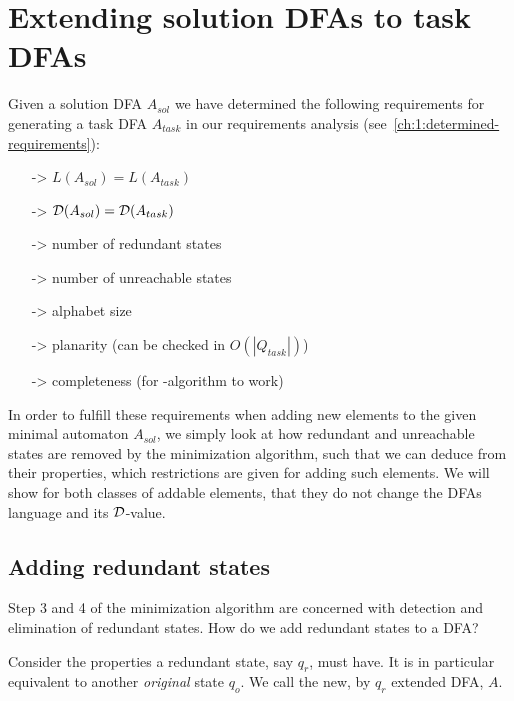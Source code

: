 
\chapter{Extending solution DFAs to task DFAs} \label{ch:3}

Given a solution DFA $A_{sol}$ we have determined the following requirements for generating a task DFA $A_{task}$ in our requirements analysis (see~\ref{ch:1:determined-requirements}):
\begin{itemize}
	\item[->] $L(A_{sol}) = L(A_{task})$
	\item[->] $\mathcal{D}(A_{sol}) = \mathcal{D}(A_{task})$
	\item[->] number of redundant states
	\item[->] number of unreachable states
	\item[->] alphabet size
	\item[->] planarity (can be checked in $O(|Q_{task}|)$)
	\item[->] completeness (for \CompDist-algorithm to work)
\end{itemize}
In order to fulfill these requirements when adding new elements to the given minimal automaton $A_{sol}$, we simply look at how redundant and unreachable states are removed by the minimization algorithm, such that we can deduce from their properties, which restrictions are given for adding such elements. We will show for both classes of addable elements, that they do not change the DFAs language and its $\mathcal{D}$-value.


\section{Adding redundant states}

Step 3 and 4 of the minimization algorithm are concerned with detection and elimination of redundant states. How do we add redundant states to a DFA?

Consider the properties a redundant state, say $q_r$, must have. It is in particular equivalent to another \emph{original} state $q_o$. We call the new, by $q_r$ extended DFA, $A$.


